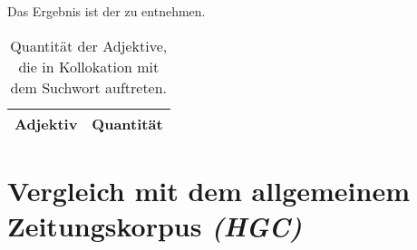 \documentclass[%
	type=document,%
  	style=article,%
  	media=print,
  	pages=oneside,%
  	prefixLecturer=Dozenten:,
  	author=multiple,
]{unihildesheim} %
\begin{document}
Das Ergebnis ist der  zu entnehmen.
\begin{table}[htpb]\label{t}
	\center
	\begin{tabularx}{0.5\textwidth}{lr}
		\toprule
		\textbf{Adjektiv} & \textbf{Quantität}\\
		\midrule
		
		\bottomrule
	\end{tabularx}
	\caption{Quantität der Adjektive, die in Kollokation mit dem Suchwort
	auftreten.}
	\label{tab:adj_mpraes}
\end{table}

\section{Vergleich mit dem allgemeinem Zeitungskorpus \textit{(HGC)}}
\end{document}
